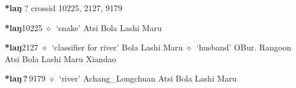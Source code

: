 \item
\textbf{*laŋ}
?
  {\tiny crossid 10225, 2127, 9179}
  \begin{list}{}{\leftmargin=1.5em \itemindent=-1.5em}
  \item {\footnotesize \textbf{*laŋ}}{\tiny 10225}
         $\diamond$~`snake'
         Atsi 
\hspace{1ex}
         Bola 
\hspace{1ex}
         Lashi 
\hspace{1ex}
         Maru 
  \item {\footnotesize \textbf{*laŋ}}{\tiny 2127}
\hspace{1ex}
         $\diamond$~`classifier for river'
         Bola 
\hspace{1ex}
         Lashi 
\hspace{1ex}
         Maru 
\hspace{1ex}
         $\diamond$~`husband'
         OBur. 
\hspace{1ex}
         Rangoon 
\hspace{1ex}
         Atsi 
\hspace{1ex}
         Bola 
\hspace{1ex}
         Lashi 
\hspace{1ex}
         Maru 
\hspace{1ex}
         Xiandao 
  \item {\footnotesize \textbf{*laŋ\,?\,}}{\tiny 9179}
\hspace{1ex}
         $\diamond$~`river'
         Achang\_Longchuan 
\hspace{1ex}
         Atsi 
\hspace{1ex}
         Bola 
\hspace{1ex}
         Lashi 
\hspace{1ex}
         Maru 
  \end{list}
\item
